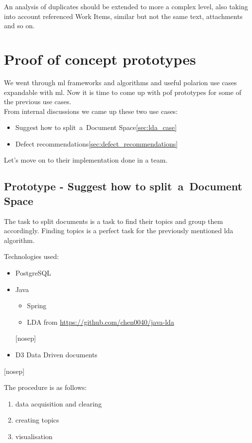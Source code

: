 \documentclass[thesis=M,english]{FITthesis}[2012/06/26]
\begin{document}
An analysis of duplicates should be extended to more a complex level, also taking into account referenced Work Items, similar but not the same text, attachments and so on.

\chapter{Proof of concept prototypes}

We went through \acrshort{ml} frameworks and algorithms and useful \acrshort{polarion} use cases expandable with \acrshort{ml}. Now it is time to come up with \acrshort{pof} prototypes for some of the previous use cases.\\

From internal discussions we came up these two use cases:
\begin{itemize}[nosep]
\item Suggest how to split a Document Space\ref{sec:lda_case}
\item Defect recommendations\ref{sec:defect_recommendations}
\end{itemize}

Let's move on to their implementation done in a team.

\section{Prototype - Suggest how to split a Document Space}

The task to split documents is a task to find their topics and group them accordingly. Finding topics is a perfect task for the previously mentioned \acrshort{lda}\cite{lda_algotithm} algorithm. 

Technologies used:
\begin{itemize}[nosep]
	\item PostgreSQL
	\item Java
	\begin{itemize}[nosep]
		\item Spring
		\item LDA from \url{https://github.com/chen0040/java-lda}
	\end{itemize}[nosep]
	\item D3 Data Driven documents\cite{d3}
\end{itemize}[nosep]

The procedure is as follows:
\begin{enumerate}[nosep]
\item data acquisition and clearing
\item creating topics
\item visualisation\\
\end{enumerate}
\end{document}
